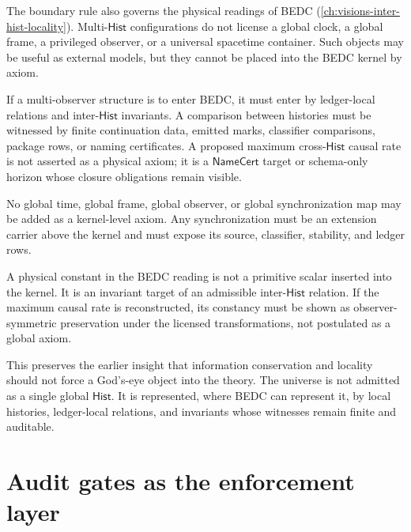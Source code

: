The boundary rule also governs the physical readings of BEDC (\autoref{ch:visions-inter-hist-locality}). Multi-$\mathsf{Hist}$ configurations do not license a global clock, a global frame, a privileged observer, or a universal spacetime container. Such objects may be useful as external models, but they cannot be placed into the BEDC kernel by axiom.

If a multi-observer structure is to enter BEDC, it must enter by ledger-local relations and inter-$\mathsf{Hist}$ invariants. A comparison between histories must be witnessed by finite continuation data, emitted marks, classifier comparisons, package rows, or naming certificates. A proposed maximum cross-$\mathsf{Hist}$ causal rate is not asserted as a physical axiom; it is a $\mathsf{NameCert}$ target or schema-only horizon whose closure obligations remain visible.

\begin{principle}
\label{prin:external-supply-no-global-frame}
No global time, global frame, global observer, or global synchronization map may be added as a kernel-level axiom. Any synchronization must be an extension carrier above the kernel and must expose its source, classifier, stability, and ledger rows.
\end{principle}

\begin{principle}
\label{prin:external-supply-physical-constants-invariant}
A physical constant in the BEDC reading is not a primitive scalar inserted into the kernel. It is an invariant target of an admissible inter-$\mathsf{Hist}$ relation. If the maximum causal rate is reconstructed, its constancy must be shown as observer-symmetric preservation under the licensed transformations, not postulated as a global axiom.
\end{principle}

This preserves the earlier insight that information conservation and locality should not force a God's-eye object into the theory. The universe is not admitted as a single global $\mathsf{Hist}$. It is represented, where BEDC can represent it, by local histories, ledger-local relations, and invariants whose witnesses remain finite and auditable.

\section{Audit gates as the enforcement layer}
\label{sec:external-supply-audit-gates}

